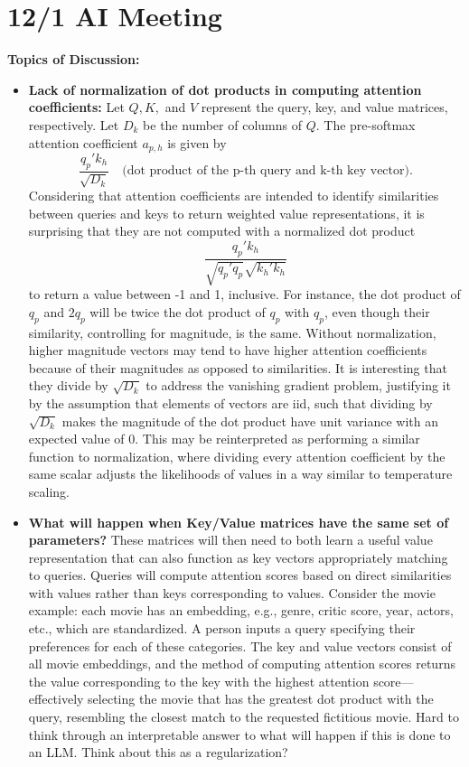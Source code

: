 \documentclass{article}
\begin{document}
\section*{12/1 AI Meeting}

\textbf{Topics of Discussion:}

\begin{itemize}
  \item \textbf{Lack of normalization of dot products in computing attention coefficients:}
    Let \( Q, K, \) and \( V \) represent the query, key, and value matrices, respectively. Let \( D_k \) be the number of columns of \( Q \). The pre-softmax attention coefficient \( a_{p, h} \) is given by
    \[
    \frac{q_p' k_h}{\sqrt{D_k}} \quad \text{(dot product of the p-th query and k-th key vector)}.
    \]
    Considering that attention coefficients are intended to identify similarities between queries and keys to return weighted value representations, it is surprising that they are not computed with a normalized dot product
    \[
    \frac{q_p' k_h}{\sqrt{q_p' q_p} \sqrt{k_h' k_h}}
    \]
    to return a value between -1 and 1, inclusive. For instance, the dot product of \( q_p \) and \( 2q_p \) will be twice the dot product of \( q_p \) with \( q_p \), even though their similarity, controlling for magnitude, is the same. Without normalization, higher magnitude vectors may tend to have higher attention coefficients because of their magnitudes as opposed to similarities. It is interesting that they divide by \( \sqrt{D_k} \) to address the vanishing gradient problem, justifying it by the assumption that elements of vectors are iid, such that dividing by \( \sqrt{D_k} \) makes the magnitude of the dot product have unit variance with an expected value of 0. This may be reinterpreted as performing a similar function to normalization, where dividing every attention coefficient by the same scalar adjusts the likelihoods of values in a way similar to temperature scaling.

  \item \textbf{What will happen when Key/Value matrices have the same set of parameters?}
    These matrices will then need to both learn a useful value representation that can also function as key vectors appropriately matching to queries. Queries will compute attention scores based on direct similarities with values rather than keys corresponding to values. Consider the movie example: each movie has an embedding, e.g., genre, critic score, year, actors, etc., which are standardized. A person inputs a query specifying their preferences for each of these categories. The key and value vectors consist of all movie embeddings, and the method of computing attention scores returns the value corresponding to the key with the highest attention score—effectively selecting the movie that has the greatest dot product with the query, resembling the closest match to the requested fictitious movie. Hard to think through an interpretable answer to what will happen if this is done to an LLM. Think about this as a regularization? 


\end{itemize}
\end{document}
